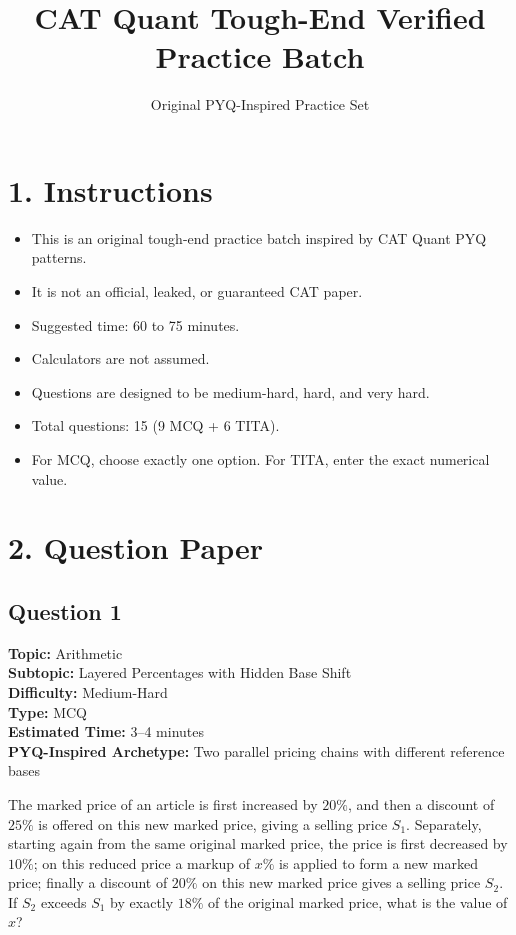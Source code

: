 \documentclass[11pt]{article}
\begin{document}
\title{CAT Quant Tough-End Verified Practice Batch}
\author{Original PYQ-Inspired Practice Set}
\date{}
\maketitle

\section*{1. Instructions}

\begin{itemize}
    \item This is an original tough-end practice batch inspired by CAT Quant PYQ patterns.
    \item It is not an official, leaked, or guaranteed CAT paper.
    \item Suggested time: 60 to 75 minutes.
    \item Calculators are not assumed.
    \item Questions are designed to be medium-hard, hard, and very hard.
    \item Total questions: 15 (9 MCQ + 6 TITA).
    \item For MCQ, choose exactly one option. For TITA, enter the exact numerical value.
\end{itemize}

\newpage
\section*{2. Question Paper}

\subsection*{Question 1}

\textbf{Topic:} Arithmetic \\
\textbf{Subtopic:} Layered Percentages with Hidden Base Shift \\
\textbf{Difficulty:} Medium-Hard \\
\textbf{Type:} MCQ \\
\textbf{Estimated Time:} 3--4 minutes \\
\textbf{PYQ-Inspired Archetype:} Two parallel pricing chains with different reference bases

\begin{tcolorbox}
The marked price of an article is first increased by \(20\%\), and then a discount of \(25\%\) is offered on this new marked price, giving a selling price \(S_1\). Separately, starting again from the same original marked price, the price is first decreased by \(10\%\); on this reduced price a markup of \(x\%\) is applied to form a new marked price; finally a discount of \(20\%\) on this new marked price gives a selling price \(S_2\). If \(S_2\) exceeds \(S_1\) by exactly \(18\%\) of the original marked price, what is the value of \(x\)?
\end{tcolorbox}
\end{document}
